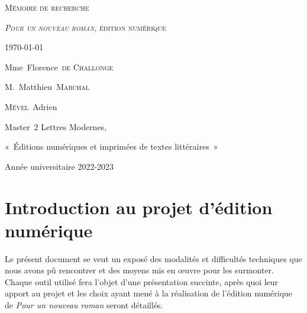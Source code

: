 \documentclass[12pt, a4paper]{article}
\begin{document}


\begin{titlepage}
  

\vspace*{3cm}

 
\begin{center}
\textsc{\huge Mémoire de recherche}

\textsc{\textit{Pour un nouveau roman}, édition numérique}



\today


\vspace*{2cm}
Mme~Florence~\textsc{de Challonge}


M.~Matthieu~\textsc{Marchal}




\vspace*{11cm}
\small
\textsc{Mével}~Adrien

Master~2 Lettres Modernes,

«~Éditions numériques et imprimées de textes littéraires~»

\vspace*{2.5cm}
Année universitaire 2022-2023




\end{center}


\end{titlepage}	

\newcommand{\punr}{\textit{Pour un nouveau roman}}
\newcommand{\robbe}{Alain~Robbe-Grillet}
\newcommand{\go}{«~}
\newcommand{\gf}{~»}




\vspace{3cm}
\section{Introduction au projet d'édition numérique}

Le présent document se veut un exposé des modalités et difficultés techniques que nous avons pû rencontrer et des moyens mis en œuvre pour les surmonter. Chaque outil utilisé fera l'objet d'une présentation succinte, après quoi leur apport au projet et les choix ayant mené à la réalisation de l'édition numérique de \punr{} seront détaillés.

\end{document}
